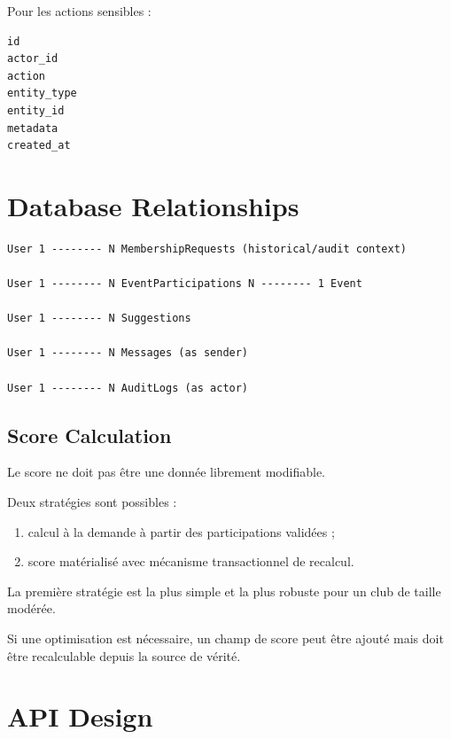 \documentclass[11pt,a4paper]{report}
\begin{document}
Pour les actions sensibles :

\begin{lstlisting}
id
actor_id
action
entity_type
entity_id
metadata
created_at
\end{lstlisting}

\chapter{Database Relationships}

\begin{verbatim}
User 1 -------- N MembershipRequests (historical/audit context)

User 1 -------- N EventParticipations N -------- 1 Event

User 1 -------- N Suggestions

User 1 -------- N Messages (as sender)

User 1 -------- N AuditLogs (as actor)
\end{verbatim}

\section{Score Calculation}

Le score ne doit pas être une donnée librement modifiable.

Deux stratégies sont possibles :

\begin{enumerate}
    \item calcul à la demande à partir des participations validées ;
    \item score matérialisé avec mécanisme transactionnel de recalcul.
\end{enumerate}

La première stratégie est la plus simple et la plus robuste pour un club de taille modérée.

Si une optimisation est nécessaire, un champ de score peut être ajouté mais doit être recalculable depuis la source de vérité.

\chapter{API Design}
\end{document}
